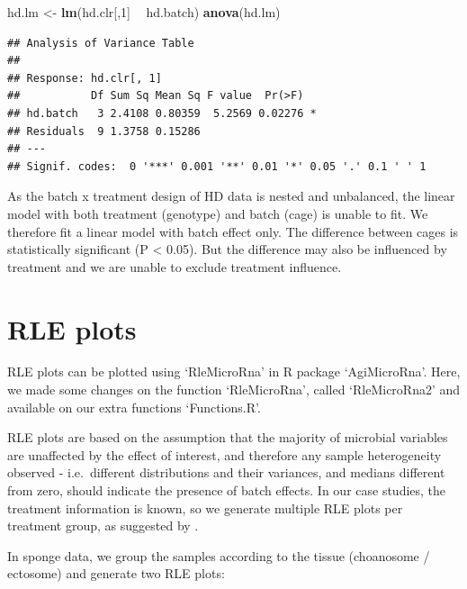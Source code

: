 \documentclass[]{book}
\newenvironment{Shaded}{\begin{snugshade}}{\end{snugshade}}
\newcommand{\KeywordTok}[1]{\textcolor[rgb]{0.13,0.29,0.53}{\textbf{#1}}}
\newcommand{\DecValTok}[1]{\textcolor[rgb]{0.00,0.00,0.81}{#1}}
\newcommand{\StringTok}[1]{\textcolor[rgb]{0.31,0.60,0.02}{#1}}
\newcommand{\OperatorTok}[1]{\textcolor[rgb]{0.81,0.36,0.00}{\textbf{#1}}}
\newcommand{\NormalTok}[1]{#1}
\begin{document}
\begin{Shaded}
\begin{Highlighting}[]
\NormalTok{hd.lm <-}\StringTok{ }\KeywordTok{lm}\NormalTok{(hd.clr[,}\DecValTok{1}\NormalTok{] }\OperatorTok{~}\StringTok{ }\NormalTok{hd.batch)}
\KeywordTok{anova}\NormalTok{(hd.lm)}
\end{Highlighting}
\end{Shaded}

\begin{verbatim}
## Analysis of Variance Table
## 
## Response: hd.clr[, 1]
##           Df Sum Sq Mean Sq F value  Pr(>F)  
## hd.batch   3 2.4108 0.80359  5.2569 0.02276 *
## Residuals  9 1.3758 0.15286                  
## ---
## Signif. codes:  0 '***' 0.001 '**' 0.01 '*' 0.05 '.' 0.1 ' ' 1
\end{verbatim}

As the batch x treatment design of HD data is nested and unbalanced, the
linear model with both treatment (genotype) and batch (cage) is unable
to fit. We therefore fit a linear model with batch effect only. The
difference between cages is statistically significant (P \textless{}
0.05). But the difference may also be influenced by treatment and we are
unable to exclude treatment influence.

\section{RLE plots}\label{rle-plots}

RLE plots can be plotted using `RleMicroRna' in R package `AgiMicroRna'.
Here, we made some changes on the function `RleMicroRna', called
`RleMicroRna2' and available on our extra functions `Functions.R'.

RLE plots are based on the assumption that the majority of microbial
variables are unaffected by the effect of interest, and therefore any
sample heterogeneity observed - i.e.~different distributions and their
variances, and medians different from zero, should indicate the presence
of batch effects. In our case studies, the treatment information is
known, so we generate multiple RLE plots per treatment group, as
suggested by \citep{lin2018scmerge}.

In sponge data, we group the samples according to the tissue (choanosome
/ ectosome) and generate two RLE plots:
\end{document}
